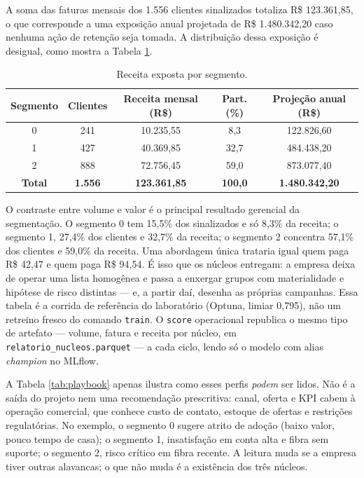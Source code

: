 \documentclass[12pt]{article}
\begin{document}
A soma das faturas mensais dos 1.556 clientes sinalizados totaliza
R\$ 123.361,85, o que corresponde a uma exposição anual projetada de
R\$ 1.480.342,20 caso nenhuma ação de retenção seja tomada. A distribuição
dessa exposição é desigual, como mostra a Tabela \ref{tab:impacto}.

\begin{table}[ht]
\centering
\caption{Receita exposta por segmento.}
\label{tab:impacto}
\small
\begin{tabular}{|c|c|c|c|c|}
\hline
\textbf{Segmento} & \textbf{Clientes} & \textbf{Receita mensal (R\$)} & \textbf{Part. (\%)} & \textbf{Projeção anual (R\$)} \\
\hline
0 & 241 & 10.235,55 & 8,3  & 122.826,60 \\ \hline
1 & 427 & 40.369,85 & 32,7 & 484.438,20 \\ \hline
2 & 888 & 72.756,45 & 59,0 & 873.077,40 \\ \hline
\textbf{Total} & \textbf{1.556} & \textbf{123.361,85} & \textbf{100,0} & \textbf{1.480.342,20} \\
\hline
\end{tabular}
\end{table}

O contraste entre volume e valor é o principal resultado gerencial da
segmentação. O segmento 0 tem 15,5\% dos sinalizados e só 8,3\% da receita;
o segmento 1, 27,4\% dos clientes e 32,7\% da receita; o segmento 2
concentra 57,1\% dos clientes e 59,0\% da receita. Uma abordagem única
trataria igual quem paga R\$ 42,47 e quem paga R\$ 94,54. É isso que os
núcleos entregam: a empresa deixa de operar uma lista homogênea e passa a
enxergar grupos com materialidade e hipótese de risco distintas --- e, a
partir daí, desenha as próprias campanhas. Essa tabela é a corrida de
referência do laboratório (Optuna, limiar 0,795), não um retreino fresco
do comando \texttt{train}. O \texttt{score} operacional republica o mesmo
tipo de artefato --- volume, fatura e receita por núcleo, em
\texttt{relatorio\_nucleos.parquet} --- a cada ciclo, lendo só o modelo
com alias \textit{champion} no MLflow.

A Tabela \ref{tab:playbook} apenas ilustra como esses perfis \textit{podem}
ser lidos. Não é a saída do projeto nem uma recomendação prescritiva: canal,
oferta e KPI cabem à operação comercial, que conhece custo de contato,
estoque de ofertas e restrições regulatórias. No exemplo, o segmento 0
sugere atrito de adoção (baixo valor, pouco tempo de casa); o segmento 1,
insatisfação em conta alta e fibra sem suporte; o segmento 2, risco crítico
em fibra recente. A leitura muda se a empresa tiver outras alavancas; o que
não muda é a existência dos três núcleos.
\end{document}
